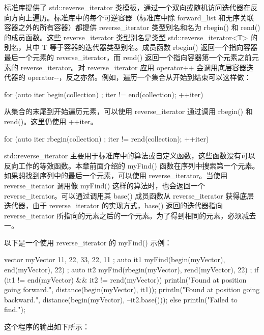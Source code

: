 
标准库提供了 std::reverse\_iterator 类模板，通过一个双向或随机访问迭代器在反向方向上遍历。标准库中的每个可逆容器（标准库中除 forward\_list 和无序关联容器之外的所有容器）都提供 reverse\_iterator 类型别名和名为 rbegin() 和 rend() 的成员函数。这些 reverse\_iterator 类型别名是类型 std::reverse\_iterator<T> 的别名，其中 T 等于容器的迭代器类型别名。成员函数 rbegin() 返回一个指向容器最后一个元素的 reverse\_iterator，而 rend() 返回一个指向容器第一个元素之前元素的 reverse\_iterator。对 reverse\_iterator 应用 operator++ 会调用底层容器迭代器的 operator-{}-，反之亦然。例如，遍历一个集合从开始到结束可以这样做：

\begin{cpp}
for (auto iter { begin(collection) }; iter != end(collection); ++iter) {}
\end{cpp}

从集合的末尾到开始遍历元素，可以使用 reverse\_iterator 通过调用 rbegin() 和 rend()。这里仍使用 ++iter。

\begin{cpp}
for (auto iter { rbegin(collection) }; iter != rend(collection); ++iter) {}
\end{cpp}

std::reverse\_iterator 主要用于标准库中的算法或自定义函数，这些函数没有可以反向工作的等效函数。本章前面介绍的 myFind() 函数在序列中搜索第一个元素。如果想找到序列中的最后一个元素，可以使用 reverse\_iterator。当使用 reverse\_iterator 调用像 myFind() 这样的算法时，也会返回一个 reverse\_iterator。可以通过调用其 base() 成员函数从 reverse\_iterator 获得底层迭代器，由于 reverse\_iterator 的实现方式，base() 返回的迭代器指向 reverse\_iterator 所指向的元素之后的一个元素。为了得到相同的元素，必须减去一。

以下是一个使用 reverse\_iterator 的 myFind() 示例：

\begin{cpp}
vector myVector { 11, 22, 33, 22, 11 };
auto it1 { myFind(begin(myVector), end(myVector), 22) };
auto it2 { myFind(rbegin(myVector), rend(myVector), 22) };
if (it1 != end(myVector) && it2 != rend(myVector)) {
    println("Found at position {} going forward.",
             distance(begin(myVector), it1));
    println("Found at position {} going backward.",
             distance(begin(myVector), --it2.base()));
} else {
    println("Failed to find.");
}
\end{cpp}

这个程序的输出如下所示：

